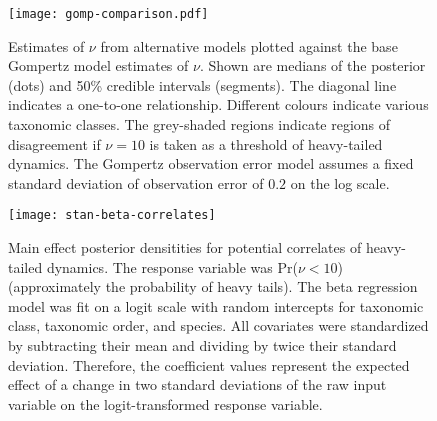 \clearpage

\begin{figure}[htbp]
\begin{center}
\texttt{[image: gomp-comparison.pdf]}
\caption{Estimates of $\nu$ from alternative models plotted against the base Gompertz model estimates of $\nu$. Shown are medians of the posterior (dots) and 50\% credible intervals (segments). The diagonal line indicates a one-to-one relationship. Different colours indicate various taxonomic classes. The grey-shaded regions indicate regions of disagreement if $\nu = 10$ is taken as a threshold of heavy-tailed dynamics. The Gompertz observation error model assumes a fixed standard deviation of observation error of $0.2$ on the log scale.}
\label{fig:alt}
\end{center}
\end{figure}

\clearpage


\begin{figure}[htbp]
\begin{center}
\texttt{[image: stan-beta-correlates]}
\caption{
  Main effect posterior densitities for potential correlates of heavy-tailed dynamics.
  The response variable was Pr($\nu < 10$) (approximately the probability of heavy tails).
  The beta regression model was fit on a logit scale with random intercepts for taxonomic class, taxonomic order, and species.
  All covariates were standardized by subtracting their mean and dividing by twice their standard deviation. Therefore, the coefficient values represent the expected effect of a change in two standard deviations of the raw input variable on the logit-transformed response variable.
}
    \label{fig:correlate-coefs}
\end{center}
\end{figure}

